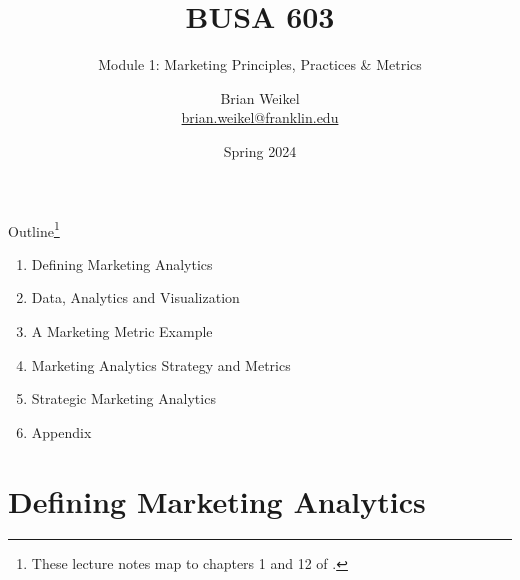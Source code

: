 \documentclass[pdf]{beamer}
\title{BUSA 603}
\subtitle{Module 1:   Marketing Principles, Practices \& Metrics}
\theoremstyle{remark}
\theoremstyle{definition}
\begin{document}
\author[B. Weikel, Franklin University]{
	\begin{tabular}{c} 
	\Large
	Brian Weikel\\
    \footnotesize \href{mailto:brian.weikel@franklin.edu}{brian.weikel@franklin.edu}
    \vspace{1ex}
\end{tabular}
\vspace{-4ex}}


\date{Spring 2024}%

\begin{noheadline}
\begin{frame}[t]\maketitle\end{frame}
\end{noheadline}

\begin{frame}[t]{Outline\footnote{
These lecture notes map to chapters 1 and 12 of \cite{davis2022}.}}
\begin{enumerate}
\item Defining Marketing Analytics
\vspace{2.0ex}
\item Data, Analytics and Visualization 
\vspace{2.0ex}
\item A Marketing Metric Example
\vspace{2.0ex}
\item Marketing Analytics Strategy and Metrics
\vspace{2.0ex}
\item Strategic Marketing Analytics
\vspace{2.0ex}
\item Appendix
\end{enumerate}
\end{frame}

\section{Defining Marketing Analytics}
\end{document}
